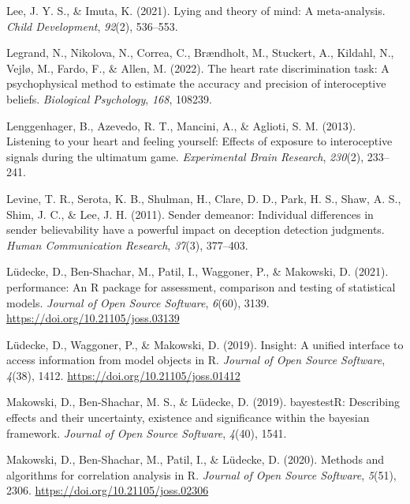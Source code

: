 \documentclass[
  man,mask,floatsintext]{apa6}
\newlength{\cslhangindent}
\newlength{\cslentryspacingunit} %
\newenvironment{CSLReferences}[2] %
 {%
  \setlength{\parindent}{0pt}
  \ifodd #1
  \let\oldpar\par
  \def\par{\hangindent=\cslhangindent\oldpar}
  \fi
  \setlength{\parskip}{#2\cslentryspacingunit}
 }%
 {}
\begin{document}
\begin{CSLReferences}{1}{0}
\leavevmode{}%
Lee, J. Y. S., \& Imuta, K. (2021). Lying and theory of mind: A meta-analysis. \emph{Child Development}, \emph{92}(2), 536--553.

\leavevmode{}%
Legrand, N., Nikolova, N., Correa, C., Brændholt, M., Stuckert, A., Kildahl, N., Vejlø, M., Fardo, F., \& Allen, M. (2022). The heart rate discrimination task: A psychophysical method to estimate the accuracy and precision of interoceptive beliefs. \emph{Biological Psychology}, \emph{168}, 108239.

\leavevmode{}%
Lenggenhager, B., Azevedo, R. T., Mancini, A., \& Aglioti, S. M. (2013). Listening to your heart and feeling yourself: Effects of exposure to interoceptive signals during the ultimatum game. \emph{Experimental Brain Research}, \emph{230}(2), 233--241.

\leavevmode{}%
Levine, T. R., Serota, K. B., Shulman, H., Clare, D. D., Park, H. S., Shaw, A. S., Shim, J. C., \& Lee, J. H. (2011). Sender demeanor: Individual differences in sender believability have a powerful impact on deception detection judgments. \emph{Human Communication Research}, \emph{37}(3), 377--403.

\leavevmode{}%
Lüdecke, D., Ben-Shachar, M., Patil, I., Waggoner, P., \& Makowski, D. (2021). {performance}: An {R} package for assessment, comparison and testing of statistical models. \emph{Journal of Open Source Software}, \emph{6}(60), 3139. \url{https://doi.org/10.21105/joss.03139}

\leavevmode{}%
Lüdecke, D., Waggoner, P., \& Makowski, D. (2019). Insight: A unified interface to access information from model objects in {R}. \emph{Journal of Open Source Software}, \emph{4}(38), 1412. \url{https://doi.org/10.21105/joss.01412}

\leavevmode{}%
Makowski, D., Ben-Shachar, M. S., \& Lüdecke, D. (2019). bayestestR: Describing effects and their uncertainty, existence and significance within the bayesian framework. \emph{Journal of Open Source Software}, \emph{4}(40), 1541.

\leavevmode{}%
Makowski, D., Ben-Shachar, M., Patil, I., \& Lüdecke, D. (2020). Methods and algorithms for correlation analysis in {R}. \emph{Journal of Open Source Software}, \emph{5}(51), 2306. \url{https://doi.org/10.21105/joss.02306}


\end{CSLReferences}
\end{document}
